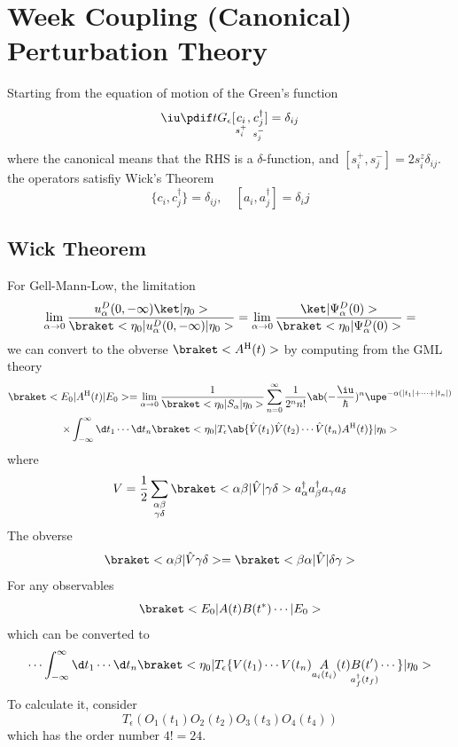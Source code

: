
\chapter{Week Coupling (Canonical) Perturbation Theory}

Starting from the equation of motion of the Green's function
\begin{equation}
  \iu\pdif t G_\epsilon [\underset{s_i^+}{c_i}, \underset{s_j^-}{c_j^\dagger}]
= \delta_{ij}
\end{equation}
where the canonical means that the RHS is a $\delta$-function,
and $[s_i^+, s_j^-] = 2s_i^z\delta_{ij}$.
the operators satisfiy Wick's Theorem
\[
  \{c_i, c_j^\dagger\} = \delta_{ij}, \quad [a_i, a_j^\dagger] = \delta_ij
\]

\section{Wick Theorem}

For Gell-Mann-Low, the limitation
\[
  \lim_{\alpha\to0} \frac{u_\alpha^D(0,-\infty)\ket|\eta_0>}
    {\braket<\eta_0|u_\alpha^D(0,-\infty)|\eta_0>}
= \lim_{\alpha\to0} \frac{\ket|\Psi_\alpha^D(0)>}
    {\braket<\eta_0|\Psi_\alpha^D(0)>}
= 
\]
we can convert to the obverse $\braket<A^\text H(t)>$ by computing from the
GML theory
\begin{multline}
  \braket<E_0|A^\text H(t)|E_0>
= \lim_{\alpha\to0} \frac1{\braket<\eta_0|S_\alpha|\eta_0>}
  \sum_{n=0}^\infty \frac1{2^nn!}
  \ab(-\frac\iu\hbar)^n \upe^{-\alpha(|t_1|+\cdots+|t_n|)} \\ \times
  \int_{-\infty}^\infty \d t_1 \cdots \d t_n
  \braket<\eta_0|T_\epsilon
  \ab\{\hat V(t_1)\hat V(t_2) \cdots \hat V(t_n) A^\text H(t)\}|\eta_0>
\end{multline}
where
\[
  V = \frac12 \sum_{\substack{\alpha\beta\\\gamma\delta}}
    \braket<\alpha\beta|\hat V|\gamma\delta>
    a_\alpha^\dagger a_\beta^\dagger a_\gamma a_\delta
\]
The obverse
\[
  \braket<\alpha\beta|\hat V\gamma\delta>
= \braket<\beta\alpha|\hat V|\delta\gamma>
\]
For any observables
\[
  \braket<E_0|A(t) B(t^*) \cdots |E_0>
\]
which can be converted to
\[
  \cdots \int_{-\infty}^\infty \d t_1 \cdots \d t_n
  \braket<\eta_0|
  T_\epsilon\{V(t_1) \cdots V(t_n)
    \underset{a_i(t_i)}A(t) \underset{a_f^\dagger(t_f)}{B(t')} \cdots\}|\eta_0>
\]
To calculate it, consider
\[
  T_\epsilon(O_1(t_1)O_2(t_2)O_3(t_3)O_4(t_4))
\]
which has the order number $4! = 24$.

